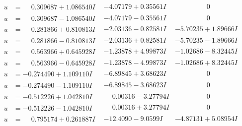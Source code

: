 \documentclass[1p]{elsarticle_modified}
\theoremstyle{definition}
\begin{document}
$$\begin{array}{c|c|c}
\begin{aligned}
u &= \phantom{-}0.309687 + 1.086540 I\end{aligned}
 & -4.07179 + 0.35561 I & \phantom{-0.000000 } 0 \\ \hline\begin{aligned}
u &= \phantom{-}0.309687 - 1.086540 I\end{aligned}
 & -4.07179 - 0.35561 I & \phantom{-0.000000 } 0 \\ \hline\begin{aligned}
u &= \phantom{-}0.281866 + 0.810813 I\end{aligned}
 & -2.03136 - 0.82581 I & -5.70235 + 1.89666 I \\ \hline\begin{aligned}
u &= \phantom{-}0.281866 - 0.810813 I\end{aligned}
 & -2.03136 + 0.82581 I & -5.70235 - 1.89666 I \\ \hline\begin{aligned}
u &= \phantom{-}0.563966 + 0.645928 I\end{aligned}
 & -1.23878 + 4.99873 I & -1.02686 - 8.32445 I \\ \hline\begin{aligned}
u &= \phantom{-}0.563966 - 0.645928 I\end{aligned}
 & -1.23878 - 4.99873 I & -1.02686 + 8.32445 I \\ \hline\begin{aligned}
u &= -0.274490 + 1.109110 I\end{aligned}
 & -6.89845 + 3.68623 I & \phantom{-0.000000 } 0 \\ \hline\begin{aligned}
u &= -0.274490 - 1.109110 I\end{aligned}
 & -6.89845 - 3.68623 I & \phantom{-0.000000 } 0 \\ \hline\begin{aligned}
u &= -0.512226 + 1.042810 I\end{aligned}
 & \phantom{-}0.00316 - 3.27794 I & \phantom{-0.000000 } 0 \\ \hline\begin{aligned}
u &= -0.512226 - 1.042810 I\end{aligned}
 & \phantom{-}0.00316 + 3.27794 I & \phantom{-0.000000 } 0 \\ \hline\begin{aligned}
u &= \phantom{-}0.795174 + 0.261887 I\end{aligned}
 & -12.4090 - 9.0599 I & -4.87131 + 5.08954 I \\ \hline\begin{aligned}

\end{aligned}
\end{array}$$
\end{document}
